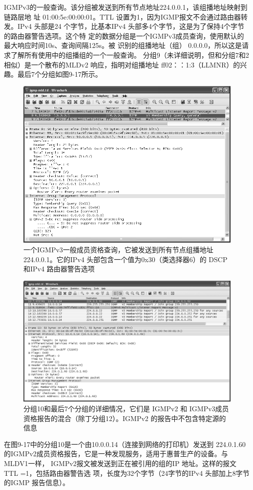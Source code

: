 IGMPv3的一般查询。该分组被发送到所有节点地址224.0.0.1，该组播地址映射到链路层地
址 01:00:5e:00:00:01。TTL 设置为1，因为IGMP报文不会通过路由器转发。IPv4 头部是24
个字节，比基本IPv4 头部多4个字节，这是为了保持4个字节的路由器警告选项。这个特
定的数据分组是一个IGMPv3成员查询，使用默认的最大响应时间10s、查询间隔125s。被
识别的组播地址（组） 0.0.0.0，所以这是请求了解所有使用中的组播组的一个一般查询。
分组9（未详细说明，但和分组7和2相似）是一个散布的MLDv2 响应，指明对组播地址
ff02：：1:3（LLMNR）的兴趣。最后7个分组如图9-17所示。
\begin{figure}[ht]
    \centering
	\includegraphics[width=1.0\textwidth]{imgs/9/9-16.png}
	\caption{一个IGMPv3一般成员资格查询，它被发送到所有节点组播地址 224.0.0.1。它的IPv4 头部包含一个值为0x30（类选择器6）的 DSCP 和IPv4 路由器警告选项}
\end{figure}

\begin{figure}[ht]
    \centering
	\includegraphics[width=1.0\textwidth]{imgs/9/9-17.png}
	\caption{分组10和最后7个分组的详细情况，它们是 IGMPv2 和 IGMPv3成员资格报告的混合（除丁分组12）。IGMPv2 的报告中不包含特定源的信息}
\end{figure}
在图9-17中的分组10是一个由10.0.0.14（连接到网络的打印机）发送到 224.0.1.60
的IGMPv2成员资格报告，它是一种发现服务，适用于惠普生产的设备。与MLDV1一样，
IGMPv2报文被发送到正在被引用的组的IP 地址。这样的报文 TTL =1，包括路由器警告选
项，长度为32个字节（24字节的IPv4 头部加上8字节的IGMP 报告信息）。


